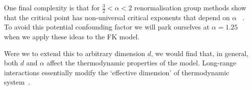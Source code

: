 One final complexity is that for \(\tfrac{3}{2} < \alpha < 2\) renormalisation group methods show that the critical point has non-universal critical exponents that depend on \(\alpha\) ~\autocite{fisherCriticalExponentsLongRange1972}. To avoid this potential confounding factor we will park ourselves at \(\alpha = 1.25\) when we apply these ideas to the FK model.

Were we to extend this to arbitrary dimension \(d\), we would find that, in general, both \(d\) and \(\alpha\) affect the thermodynamic properties of the model. Long-range interactions essentially modify the `effective dimension' of thermodynamic system~\autocite{angeliniRelationsShortrangeLongrange2014}.
